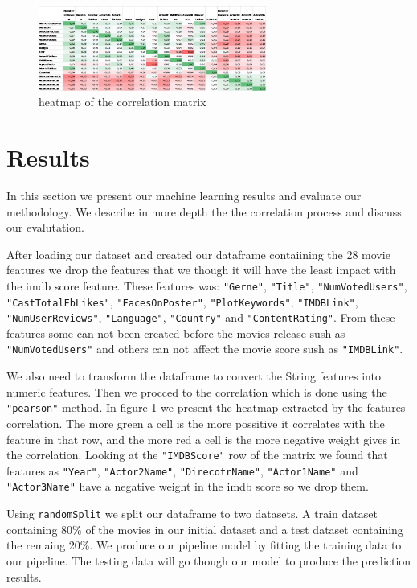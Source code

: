 \documentclass[letterpaper,twocolumn,10pt]{article}
\begin{document}
\bigskip

\begin{figure}
	
	\includegraphics[width=75mm,scale=0.3]{correlation_matrix_image}
	\caption{heatmap of the correlation matrix}
\end{figure}

\section{Results}
In this section we present our machine learning results and evaluate our methodology. We describe in more depth the the correlation process and discuss our evalutation.\par
After loading our dataset and created our dataframe contaiining the 28 movie features we drop the features that we though it will have the least impact with the imdb score feature. These features was: \texttt{"Gerne"}, \texttt{"Title"}, \texttt{"NumVotedUsers"}, \texttt{"CastTotalFbLikes"}, \texttt{"FacesOnPoster"}, \texttt{"PlotKeywords"}, \texttt{"IMDBLink"}, \texttt{"NumUserReviews"}, \texttt{"Language"}, \texttt{"Country"} and \texttt{"ContentRating"}. From these features some can not been created before the movies release sush as \texttt{"NumVotedUsers"} and others can not affect the movie score sush as \texttt{"IMDBLink"}.\par 

We also need to transform the dataframe to convert the String features into numeric features. Then we procced to the correlation which is done using the \texttt{"pearson"} method. In figure 1 we present the heatmap extracted by the features correlation. The more green a cell is the more possitive it correlates with the feature in that row, and the more red a cell is the more negative weight gives in the correlation. Looking at the \texttt{"IMDBScore"} row of the matrix we found that features as \texttt{"Year"}, \texttt{"Actor2Name"}, \texttt{"DirecotrName"}, \texttt{"Actor1Name"} and \texttt{"Actor3Name"} have a negative weight in the imdb score so we drop them.

Using \texttt{randomSplit} we split our dataframe to two datasets. A train dataset containing 80\% of the movies in our initial dataset and a test dataset containing the remaing 20\%. We produce our pipeline model by fitting the training data to our pipeline. The testing data will go though our model to produce the prediction results.\par 
\end{document}
